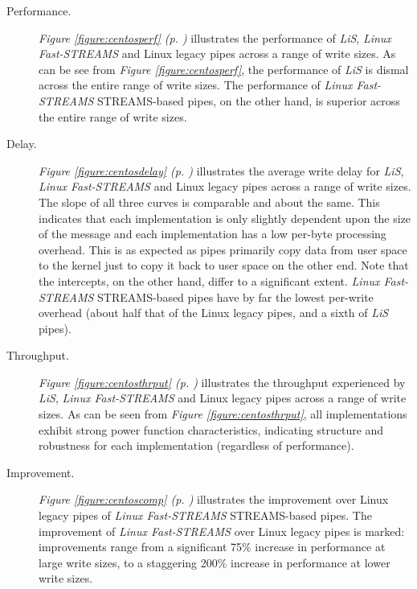 \documentclass[letterpaper,final,notitlepage,twocolumn,10pt,twoside]{article}
\begin{document}
\begin{description}

\item[Performance.]

\textit{Figure \ref{figure:centosperf} (p. \pageref{figure:centosperf})}
illustrates the performance of \textsl{LiS}, \textsl{Linux Fast-STREAMS} and
Linux legacy pipes across a range of write sizes.  As can be see from
\textit{Figure \ref{figure:centosperf}}, the performance of \textsl{LiS} is
dismal across the entire range of write sizes.  The performance of
\textsl{Linux Fast-STREAMS} STREAMS-based pipes, on the other hand, is
superior across the entire range of write sizes.

\item[Delay.]

\textit{Figure \ref{figure:centosdelay} (p. \pageref{figure:centosdelay})}
illustrates the average write delay for \textsl{LiS}, \textsl{Linux
Fast-STREAMS} and Linux legacy pipes across a range of write sizes.  The slope
of all three curves is comparable and about the same.  This indicates that
each implementation is only slightly dependent upon the size of the message
and each implementation has a low per-byte processing overhead.  This is as
expected as pipes primarily copy data from user space to the kernel just to
copy it back to user space on the other end.  Note that the intercepts, on the
other hand, differ to a significant extent.  \textsl{Linux Fast-STREAMS}
STREAMS-based pipes have by far the lowest per-write overhead (about half that
of the Linux legacy pipes, and a sixth of \textsl{LiS} pipes).

\item[Throughput.]

\textit{Figure \ref{figure:centosthrput} (p. \pageref{figure:centosthrput})}
illustrates the throughput experienced by \textsl{LiS}, \textsl{Linux
Fast-STREAMS} and Linux legacy pipes across a range of write sizes.  As can be
seen from \textit{Figure \ref{figure:centosthrput}}, all implementations
exhibit strong power function characteristics, indicating structure and
robustness for each implementation (regardless of performance).

\item[Improvement.]

\textit{Figure \ref{figure:centoscomp} (p. \pageref{figure:centoscomp})}
illustrates the improvement over Linux legacy pipes of \textsl{Linux
Fast-STREAMS} STREAMS-based pipes.  The improvement of \textsl{Linux
Fast-STREAMS} over Linux legacy pipes is marked: improvements range from a
significant 75\% increase in performance at large write sizes, to a staggering
200\% increase in performance at lower write sizes.

\end{description}
\end{document}
